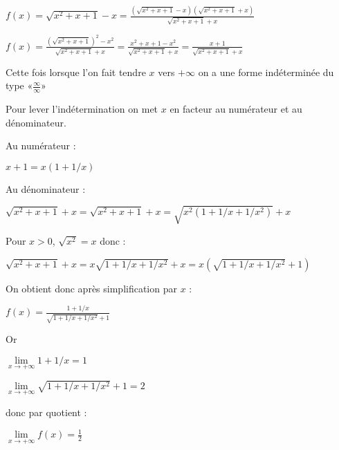 \begin{corrige}
\begin{enumerate}
          \par
          $f\left(x\right)=\sqrt{x^{2}+x+1}-x =\frac{\left(\sqrt{x^{2}+x+1}-x \right)\left(\sqrt{x^{2}+x+1} + x \right)}{\sqrt{x^{2}+x+1} + x} $
          \par
          $f\left(x\right)=\frac{\left(\sqrt{x^{2}+x+1}\right)^{2}-x^{2}}{\sqrt{x^{2}+x+1} + x }=\frac{x^{2}+x+1-x^{2}}{\sqrt{x^{2}+x+1} + x }=\frac{x+1 }{\sqrt{x^{2}+x+1} + x }$
          \par
          Cette fois lorsque l'on fait tendre $x$ vers $+\infty $ on a une forme indéterminée du type «$\frac{\infty}{\infty}$»
          \par
          Pour lever l'indétermination on met $x$ en facteur au numérateur et au dénominateur.
          \par
          Au numérateur :
          \par
          $x+1=x \left(1+1/x\right)$
          \par
          Au dénominateur :
          \par
          $\sqrt{x^{2}+x+1} + x = \sqrt{x^{2}+x+1} + x = \sqrt{x^{2}\left(1+1/x+1/x^{2}\right)} +x$
          \par
          Pour $x > 0$, $\sqrt{x^{2}}=x$ donc :
          \par
          $\sqrt{x^{2}+x+1} + x = x\sqrt{1+1/x+1/x^{2}} +x = x \left(\sqrt{1+1/x+1/x^{2}} +1\right)$
          \par
          On obtient donc après simplification par $x$ :
          \par
          $f\left(x\right)=\frac{1+1/x}{\sqrt{1+1/x+1/x^{2}} +1}$
          \par
          Or
          \par
          $\lim\limits_{x\rightarrow +\infty }1+1/x=1$
          \par
          $\lim\limits_{x\rightarrow +\infty }\sqrt{1+1/x+1/x^{2}} + 1=2$
          \par
          donc par quotient :
          \par
          $\lim\limits_{x\rightarrow +\infty }f\left(x\right)=\frac{1}{2}$
     \end{enumerate}
\end{corrige}
